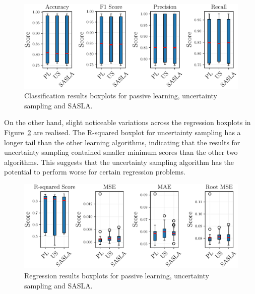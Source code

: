 \documentclass[conference]{IEEEtran}
\begin{document}
	\begin{figure}[htbp]
		\centering
		\includegraphics[width=\linewidth]{plots/classification_boxplots.pdf}
		\caption{Classification results boxplots for passive learning, uncertainty sampling and SASLA.}
		\label{fig:classification_boxplots}
	\end{figure}
	
	On the other hand, slight noticeable variations across the regression boxplots in Figure~\ref{fig:regression_boxplots} are realised. The R-squared boxplot for uncertainty sampling has a longer tail than the other learning algorithms, indicating that the results for uncertainty sampling contained smaller minimum scores than the other two algorithms. This suggests that the uncertainty sampling algorithm has the potential to perform worse for certain regression problems.
	
	\begin{figure}[htbp]
		\centering
		\includegraphics[width=\linewidth]{plots/regression_boxplots.pdf}
		\caption{Regression results boxplots for passive learning, uncertainty sampling and SASLA.}
		\label{fig:regression_boxplots}
	\end{figure}
	
\end{document}

